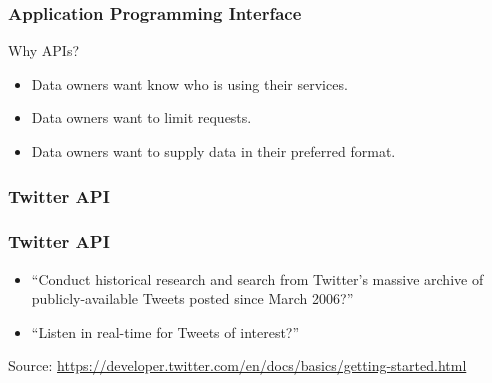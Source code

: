 
\begin{frame}
    \frametitle{Application Programming Interface}

    Why APIs?

    \begin{itemize}
        \item Data owners want know who is using their services.
        \item Data owners want to limit requests.
        \item Data owners want to supply data in their preferred format.
    \end{itemize}
\end{frame}

\subsubsection*{Twitter API}
\label{sec:twitter-api}

\begin{frame}
    \frametitle{Twitter API}
    \begin{itemize}
        \item ``Conduct historical research and search from Twitter's
        massive archive of publicly-available Tweets posted since
        March 2006?''
        \item ``Listen in real-time for Tweets of interest?''
    \end{itemize}
    Source: \url{https://developer.twitter.com/en/docs/basics/getting-started.html}
\end{frame}

